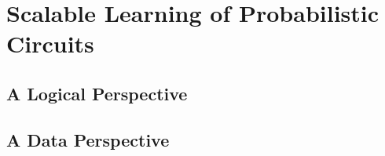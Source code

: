\chapter{Scalable Learning of Probabilistic Circuits}
\label{ch:scalable}

\section{A Logical Perspective}

\subsection{}
\label{subsection:samplepsdd}

\section{A Data Perspective}

\subsection{}
